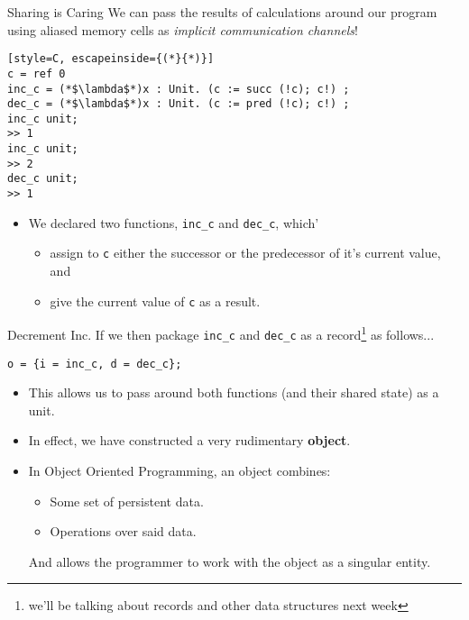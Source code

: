 \documentclass[11pt]{beamer}
\begin{document}
\begin{frame}[fragile=singleslide]{Sharing is Caring}
We can pass the results of calculations around our program using aliased memory cells as \emph{implicit communication channels}!

\begin{lstlisting}[style=C, escapeinside={(*}{*)}]
c = ref 0
inc_c = (*$\lambda$*)x : Unit. (c := succ (!c); c!) ;
dec_c = (*$\lambda$*)x : Unit. (c := pred (!c); c!) ;
inc_c unit;
>> 1
inc_c unit;
>> 2
dec_c unit;
>> 1
\end{lstlisting} 
\begin{itemize}
\item We declared two functions, \texttt{inc_c} and \texttt{dec_c}, which'
\begin{itemize}
\item assign to \texttt{c} either the successor or the predecessor of it's current value, and 
\item give the current value of \texttt{c} as a result.
\end{itemize}
\end{itemize}
\end{frame}


\begin{frame}[fragile=singleslide]{Decrement Inc.}
If we then package \texttt{inc_c} and \texttt{dec_c} as a record\footnote{we'll be talking about records and other data structures next week} as follows...

\begin{lstlisting}[style=C]
o = {i = inc_c, d = dec_c};
\end{lstlisting}

\begin{itemize}
\item This allows us to pass around both functions (and their shared state) as a unit.  
\item In effect, we have constructed a very rudimentary \textbf{object}.
\item In Object Oriented Programming, an object combines:
\begin{itemize}
\item Some set of persistent data.
\item Operations over said data.
\end{itemize}
And allows the programmer to work with the object as a singular entity.  
\end{itemize}
\end{frame}
\end{document}
